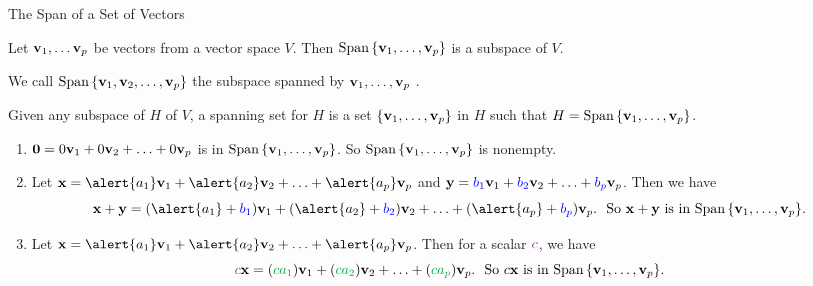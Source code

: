 \documentclass[xcolor=dvipsnames,aspectratio=169,t]{beamer}
\begin{document}
\begin{frame}{The Span of a Set of Vectors}
  \begin{theorem}
    Let $\mathbf{v}_1, \ldots \mathbf{v}_p$ be vectors from a vector space $V$. Then $\mbox{Span} \left\{ \mathbf{v}_1, \ldots, \mathbf{v}_p \right\}$ is a \alert{subspace} of $V$.
  \end{theorem}
  \bi
  \item We call $\mbox{Span} \left\{ \mathbf{v}_1, \mathbf{v}_2, \ldots, \mathbf{v}_p \right\}$  the \alert{subspace spanned by $\mathbf{v}_1, \ldots , \mathbf{v}_p$ }.
  \item Given any subspace of $H$ of $V$, a \alert{spanning set for $H$} is a set $\left\{ \mathbf{v}_1, \ldots, \mathbf{v}_p \right\}$ in $H$ such that $H=\mbox{Span} \left\{ \mathbf{v}_1, \ldots, \mathbf{v}_p \right\}$.
  \ei
  
  \pause
  \begin{enumerate}[<+->]  %
    \item $\mathbf{0}=0\mathbf{v}_1 + 0\mathbf{v}_2 + \ldots + 0\mathbf{v}_p$ is in $\mbox{Span} \left\{ \mathbf{v}_1, \ldots, \mathbf{v}_p \right\}$.
    \medskip
    So $\mbox{Span} \left\{ \mathbf{v}_1, \ldots, \mathbf{v}_p \right\}$ is nonempty.
    \item Let $\x = \alert{a_1} \v_1 +  \alert{a_2} \v_2 +  \ldots  + \alert{a_p} \v_p$ and $\mathbf{y} = \textcolor{blue}{b_1} \mathbf{v}_1 +  \textcolor{blue}{b_2} \mathbf{v}_2  + \ldots + \textcolor{blue}{b_p} \mathbf{v}_p$. Then we have
    \[ \x + \y = (\alert{a_1} + \colorb{b_1}) \v_1 +   (\alert{a_2} + \colorb{b_2}) \v_2 +  \ldots +   (\alert{a_p} + \colorb{b_p}) \v_p. 
    \ \text{ So $\x+\y$ is in $\mbox{Span} \left\{ \v_1, \ldots, \v_p \right\}$.} \]
    \item Let $\x = \alert{a_1} \v_1 +  \alert{a_2} \v_2 +  \ldots  + \alert{a_p} \v_p$. Then for a scalar $\colorp{c}$, we have
    \[ \colorp{c} \x = (\colorg{ca_1}) \v_1 +  (\colorg{ca_2})  \v_2 +  \ldots + (\colorg{ca_p})  \v_p. 
    \ \text{ So $c\x$ is in $\mbox{Span} \left\{ \v_1, \ldots, \v_p \right\}$.} \]
  \end{enumerate}
\end{frame}
\end{document}
